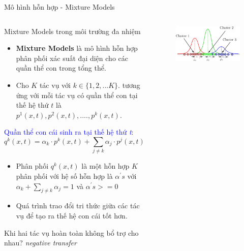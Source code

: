 	\begin{frame}{Mô hình hỗn hợp - Mixture Models}
	    \begin{columns}
		\begin{itemize}
	    	\begin{block}{Mixture Models trong môi trường đa nhiệm}
        		\begin{itemize}
        		\setlength\itemsep{0.03em}
                \item \textbf{Mixture Models} là mô hình hỗn hợp phân phối xác suất đại diện cho các quần thể con trong tổng thể.
                \item Cho $K$ tác vụ với $k \in \{1,2,...K\}$. tương ứng với mỗi tác vụ có quần thể con tại thế hệ thứ $t$ là $p^1(x,t), p^2(x,t),...., p^k(x,t)$.
                \end{itemize}
                \textcolor{blue}{Quần thể con cái sinh ra tại thế hệ thứ \textit{t}}:
                	\begin{equation}
                        q^k(x,t) = \alpha_k \cdot p^k(x,t) + \sum_{j \neq k} \alpha_j \cdot p^j(x,t)
                        \label{equa:mixture_distribution}
                    \end{equation}
                \begin{itemize}
                    \item Phân phối $q^k(x,t)$ là một hỗn hợp $K$ phân phối với hệ số hỗn hợp là $\alpha^{'}s$ với $\alpha_k + \sum_{j \neq k} \alpha_j = 1$ và $\alpha^{'}s >= 0$
                    \item Quá trình trao đổi tri thức giữa các tác vụ để tạo ra thế hệ con cái tốt hơn.
                \end{itemize}
                \Rightarrow Khi hai tác vụ hoàn toàn không bổ trợ cho nhau? \emph{negative transfer}
			\end{block}
		\end{itemize}
		\begin{figure}
            \centering
                \includegraphics[width=1.0\textwidth]{images/mixture-prob.png}

\end{figure}
\end{columns}
\end{frame}
